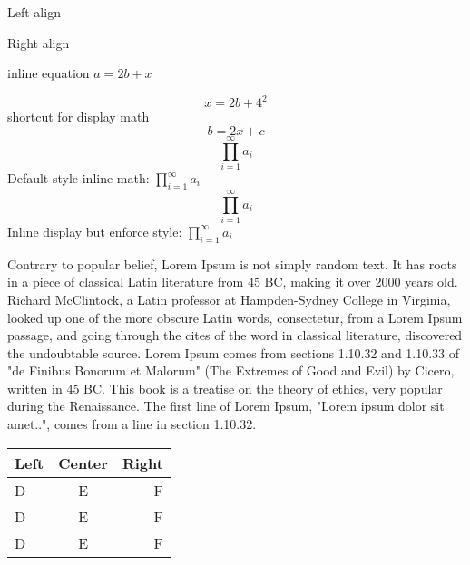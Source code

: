 \documentclass{article}
\begin{document}
	\begin{flushleft}
		Left align
	\end{flushleft}
	
	\begin{flushright}
		Right align
	\end{flushright}

	inline equation $a=2b+x$

	\begin{displaymath}
		x=2b+4^2
	\end{displaymath}
	shortcut for display math $$b=2x+c$$
	\begin{displaymath}		
		\prod_{i=1}^{\infty} a_{i}
	\end{displaymath}
	Default style inline math: $\prod_{i=1}^{\infty} a_{i}$
	$$	\prod_{i=1}^{\infty} a_{i} $$
	Inline display but enforce style: ${\displaystyle \prod_{i=1}^{\infty} a_{i}}$
	
	Contrary to popular belief, Lorem Ipsum is not simply random text.
	It has roots in a piece of classical Latin literature from 45 BC,
	making it over 2000 years old. Richard McClintock, a Latin professor
	at Hampden-Sydney College in Virginia, looked up one of the more
	obscure Latin words, consectetur, from a Lorem Ipsum passage, and
	going through the cites of the word in classical literature,
	discovered the undoubtable source. Lorem Ipsum comes from sections
	1.10.32 and 1.10.33 of "de Finibus Bonorum et Malorum"
	(The Extremes of Good and Evil) by Cicero, written in 45 BC.
	This book is a treatise on the theory of ethics, very popular
	during the Renaissance. The first line of Lorem Ipsum,
	"Lorem ipsum dolor sit amet..", comes from a line in section 1.10.32.

	\begin{tabular}{|lc|r|}
		\hline
		Left & Center & Right \tabularnewline
		\hline
		\hline
		D & E & F \tabularnewline
		\hline
		D & E & F \tabularnewline
		D & E & F \tabularnewline
		\hline
		
	\end{tabular}
	
\end{document}
